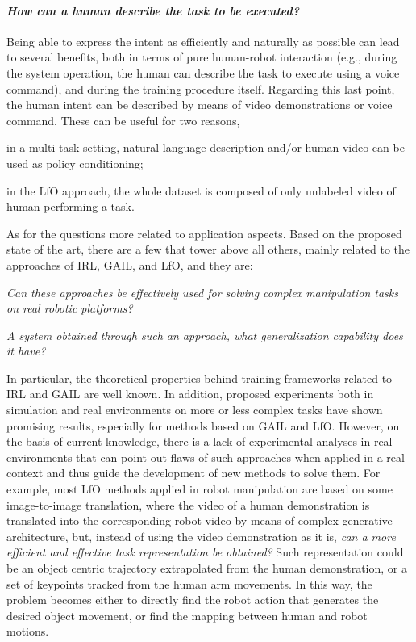 \paragraph{\textit{How can a human describe the task to be executed?}} Being able to express the intent as efficiently and naturally as possible can lead to several benefits, both in terms of pure human-robot interaction (e.g., during the system operation, the human can describe the task to execute using a voice command), and during the training procedure itself. Regarding this last point, the human intent can be described by means of video demonstrations or voice command. These can be useful for two reasons, \begin{enumerate*}[label=\textbf{(\arabic*)}]
    \item in a multi-task setting, natural language description and/or human video can be used as policy conditioning;
    \item in the LfO approach, the whole dataset is composed of only unlabeled video of human performing a task.
\end{enumerate*}

As for the questions more related to application aspects. Based on the proposed state of the art, there are a few that tower above all others, mainly related to the approaches of IRL, GAIL, and LfO, and they are: 
\begin{enumerate*}[label=\textbf{(\arabic*)}]
    \item \textit{Can these approaches be effectively used for solving complex manipulation tasks on real robotic platforms?}
    \item \textit{A system obtained through such an approach, what generalization capability does it have?}
\end{enumerate*} In particular, the theoretical properties behind training frameworks related to IRL and GAIL are well known. In addition, proposed experiments both in simulation and real environments on more or less complex tasks have shown promising results, especially for methods based on GAIL and LfO. However, on the basis of current knowledge, there is a lack of experimental analyses in real environments that can point out flaws of such approaches when applied in a real context and thus guide the development of new methods to solve them. For example, most LfO methods applied in robot manipulation are based on some image-to-image translation, where the video of a human demonstration is translated into the corresponding robot video by means of complex generative architecture, but, instead of using the video demonstration as it is, \textit{can a more efficient and effective task representation be obtained?} Such representation could be an object centric trajectory extrapolated from the human demonstration, or a set of keypoints tracked from the human arm movements. In this way, the problem becomes either to directly find the robot action that generates the desired object movement, or find the mapping between human and robot motions.